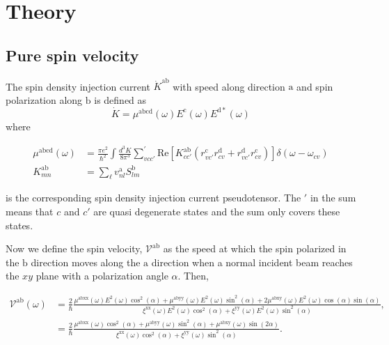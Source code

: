 \documentclass[prb,11pt,tightenlines,twocolumn,aps]{revtex4-1}
\begin{document}
\section{Theory} %
\label{sec:theory}




{\color{red}
\subsection{Pure spin velocity} %
\label{sec:theory-pure_spin_current}

The spin density injection current $\dot{K}^{\mathrm{ab}}$ with speed along
direction $\mathrm{a}$ and spin polarization along $\mathrm{b}$ is defined as
\begin{equation}
\dot{K} = \mu^{\mathrm{abcd}}(\omega)
E^{\mathrm{c}}(\omega) E^{\mathrm{d*}}(\omega)
\label{eq:dotk}
\end{equation}
where
\begin{widetext}
\begin{align}
\mu^{\mathrm{abcd}} (\omega) 
&=
\frac{\pi e^{2}}{\hbar^{2}} \int 
\frac{d^{3}K}{8 \pi^{3}} \sum_{vcc'}^{'}
\mathrm{Re} \left[ K^{\mathrm{ab}}_{cc'} ( 
r^{\mathrm{c}}_{vc'} 
r^{\mathrm{d}}_{cv } +
r^{\mathrm{d}}_{vc'} 
r^{\mathrm{c}}_{cv } ) \right]
\delta(\omega-\omega_{cv})
\label{eq:mu}
\\
K^{\mathrm{ab}}_{mn}
&=
\sum_{\ell}v^{\mathrm{a}}_{nl} S^{\mathrm{b}}_{lm}
\label{eq:velspi-matelem}
\end{align}
\end{widetext}
is the corresponding spin density injection current pseudotensor. The $'$
in the sum means that $c$ and $c'$ are quasi degenerate states and the sum only
covers these states.

Now we define the spin velocity, $\mathcal{V}^{\mathrm{ab}}$ as the speed at
which the spin polarized in the $\mathrm{b}$   direction moves along the
$\mathrm{a}$ direction when a normal incident beam reaches the $xy$ plane with a
polarization angle $\alpha$. Then,
} %
\begin{widetext}
\begin{align}
\mathcal{V}^{\mathrm{ab}} (\omega) 
&= \frac{2}{\hbar}
\frac{\mu^{\mathrm{abxx}}(\omega)
E^{2}(\omega)\cos^{2}(\alpha) + 
\mu^{\mathrm{abyy}}(\omega)
E^{2}(\omega)\sin^{2}(\alpha) + 
2\mu^{\mathrm{abxy}}(\omega)
E^{2}(\omega)\cos(\alpha)\sin(\alpha)}
{\xi^{\mathrm{xx}}(\omega)
E^{2}(\omega)\cos^{2}(\alpha) + 
\xi^{\mathrm{yy}}(\omega)
E^{2}(\omega)\sin^{2}(\alpha)},
\nonumber \\
&= \frac{2}{\hbar}
\frac{\mu^{\mathrm{abxx}}(\omega)\cos^{2}(\alpha) + 
\mu^{\mathrm{abyy}}(\omega)\sin^{2}(\alpha) + 
\mu^{\mathrm{abxy}}(\omega)\sin(2\alpha)}
{\xi^{\mathrm{xx}}(\omega)\cos^{2}(\alpha) + 
\xi^{\mathrm{yy}}(\omega)\sin^{2}(\alpha)}.
\label{eq:vab}
\end{align}
\end{widetext}
\end{document}
